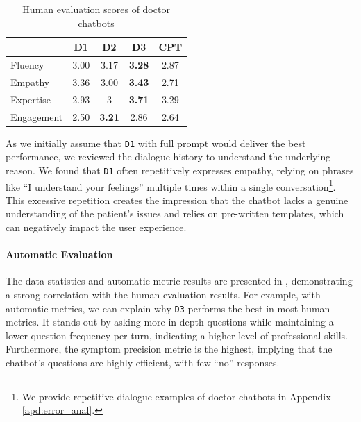 \begin{table}[th]
    \small
    \centering
    \begin{tabular}{l|ccc|c}
    \hline
     & D1 & D2 & D3 & CPT \\ 
    \hline
    Fluency &3.00	&3.17	&\textbf{3.28}	&2.87 \\
    Empathy &3.36	&3.00	&\textbf{3.43}	&2.71 \\
    Expertise & 2.93	&3	&\textbf{3.71}	&3.29\\
    Engagement & 2.50	&\textbf{3.21}	&2.86	&2.64 \\
    \hline
    \end{tabular}
    \caption{Human evaluation scores of doctor chatbots}
    \label{tab:human_doc}
\end{table}

As we initially assume that \texttt{D1} with full prompt would deliver the best performance, we reviewed the dialogue history to understand the underlying reason. We found that \texttt{D1} often repetitively expresses empathy, relying on phrases like ``I understand your feelings'' multiple times within a single conversation\footnote{We provide repetitive dialogue examples of doctor chatbots in Appendix \ref{apd:error_anal}.}. This excessive repetition creates the impression that the chatbot lacks a genuine understanding of the patient's issues and relies on pre-written templates, which can negatively impact the user experience.

\paragraph{Automatic Evaluation}
The data statistics and automatic metric results are presented in , demonstrating a strong correlation with the human evaluation results. 
For example, with automatic metrics, we can explain why \texttt{D3} performs the best in most human metrics. It stands out by asking more in-depth questions while maintaining a lower question frequency per turn, indicating a higher level of professional skills. Furthermore, the symptom precision metric is the highest, implying that the chatbot's questions are highly efficient, with few ``no'' responses.  

